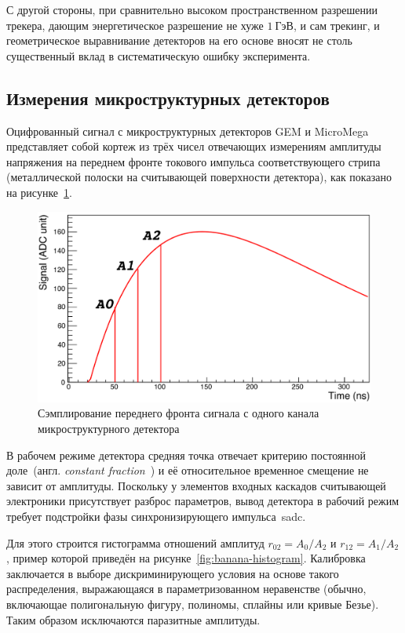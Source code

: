 С другой стороны, при сравнительно высоком пространственном разрешении
трекера, дающим энергетическое разрешение не хуже $1~\text{ГэВ}$,
и сам трекинг, и геометрическое выравнивание детекторов на его основе
вносят не столь существенный вклад в систематическую ошибку эксперимента.

\subsection{Измерения микроструктурных детекторов}

Оцифрованный сигнал с микроструктурных детекторов GEM и MicroMega представляет
собой кортеж из трёх чисел отвечающих измерениям амплитуды напряжения на переднем
фронте токового импульса соответствующего стрипа (металлической полоски на считывающей
поверхности детектора), как показано на рисунке~\ref{fig:apv-pulse-sampling}.

\begin{figure}
    \centering
    \includegraphics[width=0.45\linewidth]{images//illustrative/mm-amps.png}
    \caption{Сэмплирование переднего фронта сигнала с одного канала
    микроструктурного детектора~\cite{na64-BANERJEE201872}}
    \label{fig:apv-pulse-sampling}
\end{figure}

В рабочем режиме детектора средняя точка отвечает критерию постоянной
доле~(англ. \emph{constant fraction}~\cite{grupenDetectors2008}) и её
относительное временное смещение не зависит от
амплитуды. Поскольку у элементов входных каскадов считывающей электроники присутствует
разброс параметров, вывод детектора в рабочий режим требует
подстройки фазы синхронизирующего импульса~\acrshort{sadc}.

Для этого строится гистограмма отношений
амплитуд $r_{02}=A_0/A_2$ и $r_{12}=A_1/A_2$,
пример которой приведён на рисунке~\ref{fig:banana-histogram}. Калибровка 
заключается в выборе дискриминирующего условия на основе такого
распределения, выражающаяся в параметризованном неравенстве (обычно,
включающае полигональную фигуру, полиномы, сплайны или кривые Безье).
Таким образом исключаются паразитные
амплитуды.


